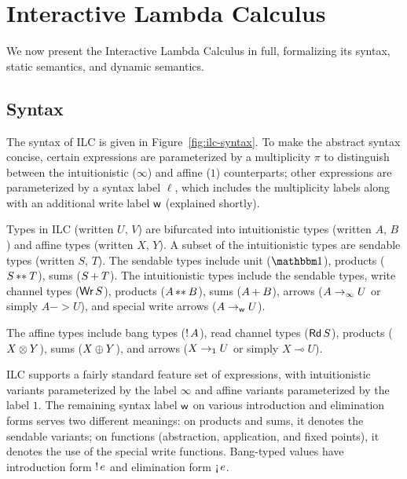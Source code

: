 
%



\section{Interactive Lambda Calculus}
\label{sec:ilc}

We now present the Interactive Lambda Calculus in full, formalizing its syntax,
static semantics, and dynamic semantics.

\subsection{Syntax}
\label{subsec:syntax}

The syntax of ILC is given in Figure~\ref{fig:ilc-syntax}. To make the abstract
syntax concise, certain expressions are parameterized by a multiplicity $\pi$ to
distinguish between the intuitionistic ($\infty$) and affine ($1$) counterparts;
other expressions are parameterized by a syntax label $\ell$, which includes the
multiplicity labels along with an additional write label $\textsf{w}$ (explained
shortly).

Types in ILC (written $U$, $V$) are bifurcated into intuitionistic types
(written $A$, $B$) and affine types (written $X$, $Y$). A subset of the
intuitionistic types are sendable types (written $S$, $T$). The sendable types
include unit ($\tyUnit$), products (${S}\, {**}_{}\, {T}$), sums
(${S}\, {+}_{}\, {T}$). The intuitionistic types include the sendable types, write
channel types ($\textnormal{\textsf{Wr}}\,S$), products (${A}\, {**}_{}\, {B}$), sums
(${A}\, {+}_{}\, {B}$), arrows (${A}\rightarrow_{\infty}{U}$ or simply $A -> U$), and special
write arrows (${A}\rightarrow_{\textsf{w}}{U}$). 

The affine types include bang types (${!}\,{A}$), read channel types
($\textnormal{\textsf{Rd}}\,S$), products (${X}\otimes{Y}$), sums (${X}\oplus{Y}$), and arrows
(${X}\rightarrow_{1}{U}$ or simply $X \multimap U$).


ILC supports a fairly standard feature set of expressions, with intuitionistic
variants parameterized by the label $\infty$ and affine variants parameterized by the
label $1$. The remaining syntax label $\textsf{w}$ on various introduction and
elimination forms serves two different meanings: on products and sums, it
denotes the sendable variants; on functions (abstraction, application, and fixed
points), it denotes the use of the special write functions. Bang-typed values
have introduction form ${!}\,{e}$ and elimination form $\textnormal{!`}\,{e}$.

